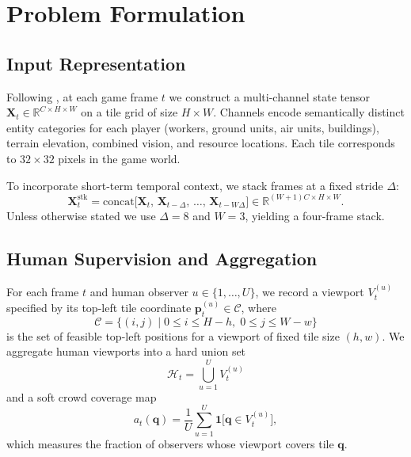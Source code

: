 \documentclass[preprint,12pt]{elsarticle}
\begin{document}
\section{Problem Formulation}
\label{sec:problem}

\subsection{Input Representation}

Following \cite{joo2023learning, bae2025observer, anonymous2025kbrs}, at 
each game frame $t$ we construct a multi-channel state tensor 
$\mathbf{X}_t \in \mathbb{R}^{C \times H \times W}$ on a tile grid of size 
$H \times W$. Channels encode semantically distinct entity categories for 
each player (workers, ground units, air units, buildings), terrain elevation, 
combined vision, and resource locations. Each tile corresponds to 
$32 \times 32$ pixels in the game world.

To incorporate short-term temporal context, we stack frames at a fixed 
stride $\Delta$:
\begin{equation}
  \mathbf{X}^{\text{stk}}_t 
    = \text{concat}\bigl[\mathbf{X}_t,\,\mathbf{X}_{t-\Delta},\,
      \ldots,\,\mathbf{X}_{t-W\Delta}\bigr]
    \in \mathbb{R}^{(W+1)C \times H \times W}.
  \label{eq:stacking}
\end{equation}
Unless otherwise stated we use $\Delta = 8$ and $W = 3$, yielding a 
four-frame stack.

\subsection{Human Supervision and Aggregation}

For each frame $t$ and human observer $u \in \{1,\ldots,U\}$, we record a 
viewport $V^{(u)}_t$ specified by its top-left tile coordinate 
$\mathbf{p}^{(u)}_t \in \mathcal{C}$, where
\begin{equation}
  \mathcal{C} = \{(i,j) \mid 0 \le i \le H - h,\; 0 \le j \le W - w\}
  \label{eq:feasible}
\end{equation}
is the set of feasible top-left positions for a viewport of fixed tile size 
$(h, w)$. We aggregate human viewports into a hard union set
\begin{equation}
  \mathcal{H}_t = \bigcup_{u=1}^{U} V^{(u)}_t
  \label{eq:union}
\end{equation}
and a soft crowd coverage map
\begin{equation}
  a_t(\mathbf{q}) = \frac{1}{U} \sum_{u=1}^{U} 
    \mathbf{1}\!\bigl[\mathbf{q} \in V^{(u)}_t\bigr],
  \label{eq:coverage}
\end{equation}
which measures the fraction of observers whose viewport covers tile 
$\mathbf{q}$.
\end{document}
